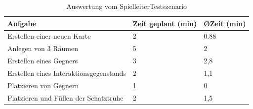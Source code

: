\begin{table}

\begin{tabularx}{\textwidth}{|X|l|l|}
\hline
Aufgabe & Zeit geplant (min) & \O Zeit (min)\\
\hline
\hline
Erstellen einer neuen Karte & 2 & 0.88 \\
\hline
Anlegen von 3 Räumen & 5 & 2 \\
\hline
Erstellen eines Gegners & 3 & 2,8 \\
\hline
Erstellen eines Interaktionsgegenstands & 2 & 1,1 \\
\hline
Platzieren von Gegnern & 1 & 0 \\
\hline
Platzieren und Füllen der Schatztruhe & 2 & 1,5 \\

\hline
\end{tabularx}
\caption{Auswertung vom Spielleiter\-Testszenario}
	\label{tab:FragebogenB}
\end{table}






